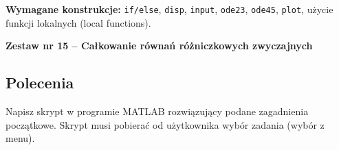 \documentclass[a4paper,11pt]{article}
\begin{document}
\vspace{0.3cm}
\begin{ramka}
\textbf{Wymagane konstrukcje:}
\texttt{if/else}, \texttt{disp}, \texttt{input}, \texttt{ode23}, \texttt{ode45}, \texttt{plot}, użycie funkcji lokalnych (local functions).
\end{ramka}

\clearpage
\begin{center}
  {\large\bfseries Zestaw nr 15 \quad -- \quad Całkowanie równań różniczkowych zwyczajnych}
\end{center}
\hrulefill
\vspace{0.4cm}

\subsection*{Polecenia}

Napisz skrypt w programie MATLAB rozwiązujący podane zagadnienia początkowe. Skrypt musi pobierać od użytkownika wybór zadania (wybór z menu).
\end{document}
